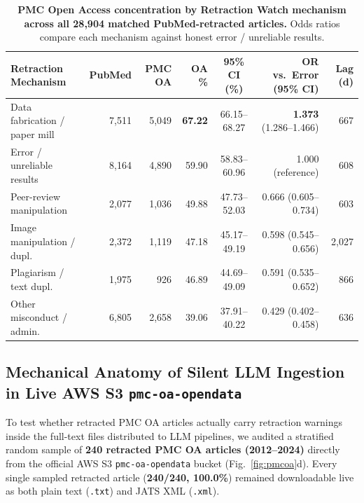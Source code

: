 \documentclass[11pt,letterpaper]{article}
\begin{document}
\begin{table}[t]
\centering
\caption{\textbf{PMC Open Access concentration by Retraction Watch mechanism across all 28,904 matched PubMed-retracted articles.} Odds ratios compare each mechanism against honest error / unreliable results.}
\label{tab:pmcoa_mech}
\footnotesize
\setlength{\tabcolsep}{3.5pt}
\begin{tabularx}{\textwidth}{@{} >{\raggedright\arraybackslash}X r r r c r r @{}}
\toprule
\textbf{Retraction Mechanism} & \textbf{PubMed} & \textbf{PMC OA} & \textbf{OA \%} & \textbf{95\% CI (\%)} & \textbf{OR vs.\ Error (95\% CI)} & \textbf{Lag (d)} \\
\midrule
Data fabrication / paper mill & 7,511 & 5,049 & \textbf{67.22} & 66.15--68.27 & \textbf{1.373} (1.286--1.466) & 667 \\
Error / unreliable results & 8,164 & 4,890 & 59.90 & 58.83--60.96 & 1.000 (reference) & 608 \\
Peer-review manipulation & 2,077 & 1,036 & 49.88 & 47.73--52.03 & 0.666 (0.605--0.734) & 603 \\
Image manipulation / dupl. & 2,372 & 1,119 & 47.18 & 45.17--49.19 & 0.598 (0.545--0.656) & 2,027 \\
Plagiarism / text dupl. & 1,975 & 926 & 46.89 & 44.69--49.09 & 0.591 (0.535--0.652) & 866 \\
Other misconduct / admin. & 6,805 & 2,658 & 39.06 & 37.91--40.22 & 0.429 (0.402--0.458) & 636 \\
\bottomrule
\end{tabularx}
\end{table}

\subsection{Mechanical Anatomy of Silent LLM Ingestion in Live AWS S3 \texttt{pmc-oa-opendata}}
To test whether retracted PMC OA articles actually carry retraction warnings inside the full-text files distributed to LLM pipelines, we audited a stratified random sample of \textbf{240 retracted PMC OA articles (2012--2024)} directly from the official AWS S3 \texttt{pmc-oa-opendata} bucket (Fig.~\ref{fig:pmcoa}d). Every single sampled retracted article (\textbf{240/240, 100.0\%}) remained downloadable live as both plain text (\texttt{.txt}) and JATS XML (\texttt{.xml}).
\end{document}
